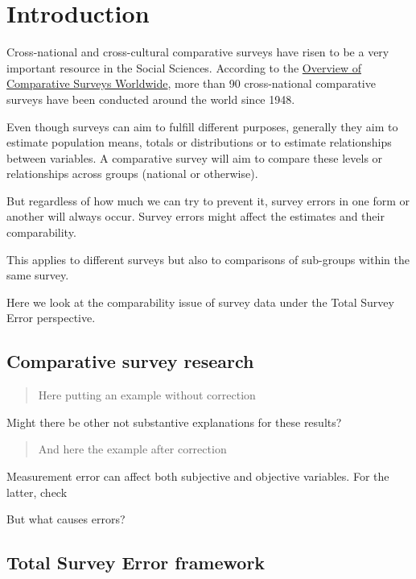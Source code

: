 \documentclass[
]{book}
\begin{document}
\hypertarget{intro}{%
\chapter{Introduction}\label{intro}}

Cross-national and cross-cultural comparative surveys have risen to be a very important resource in the Social Sciences. According to the \href{https://www.gesis.org/angebot/daten-analysieren/weitere-sekundaerdaten/uebersichten/overview-of-comparative-surveys-worldwide}{Overview of Comparative Surveys Worldwide}, more than 90 cross-national comparative surveys have been conducted around the world since 1948.

Even though surveys can aim to fulfill different purposes, generally they aim to estimate population means, totals or distributions or to estimate relationships between variables. A comparative survey will aim to compare these levels or relationships across groups (national or otherwise).

But regardless of how much we can try to prevent it, survey errors in one form or another will always occur. Survey errors might affect the estimates and their comparability.

This applies to different surveys but also to comparisons of sub-groups within the same survey.

Here we look at the comparability issue of survey data under the Total Survey Error perspective.

\hypertarget{comparative-survey-research}{%
\section{Comparative survey research}\label{comparative-survey-research}}

\begin{quote}
Here putting an example without correction
\end{quote}

Might there be other not substantive explanations for these results?

\begin{quote}
And here the example after correction
\end{quote}

Measurement error can affect both subjective and objective variables. For the latter, check \citet{alwin}

But what causes errors?

\hypertarget{total-survey-error-framework}{%
\section{Total Survey Error framework}\label{total-survey-error-framework}}
\end{document}
